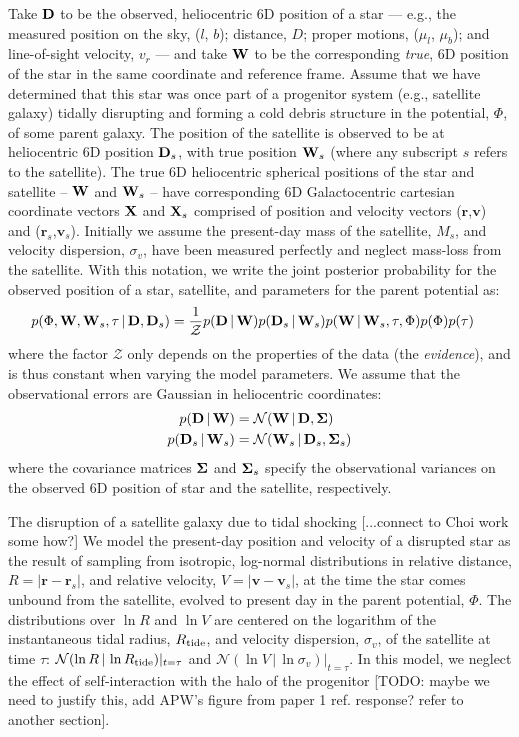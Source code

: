 \documentclass[letterpaper,12pt,preprint]{aastex}
\newcommand{\given}{\,|\,}
\newcommand{\D}{{\bf D}}
\newcommand{\W}{{\bf W}}
\newcommand{\X}{{\bf X}}
\newcommand{\bSigma}{{\bf \Sigma}}
\newcommand{\rtide}{R_{\rm tide}}
\newcommand{\bsr}{\boldsymbol r}
\newcommand{\bsv}{\boldsymbol v}
\begin{document}
Take $\D$ to be the observed, heliocentric 6D position of a star --- e.g., the measured position on the sky, ($l$, $b$); distance, $D$; proper motions, ($\mu_l$, $\mu_b$); and line-of-sight velocity, $v_r$ --- and take $\W$ to be the corresponding \emph{true}, 6D position of the star in the same coordinate and reference frame. Assume that we have determined that this star was once part of a progenitor system (e.g., satellite galaxy) tidally disrupting and forming a cold debris structure in the potential, $\Phi$, of some parent galaxy. The position of the satellite is observed to be at heliocentric 6D position $\D_s$, with true position $\W_s$ (where any subscript $s$ refers to the satellite). The true 6D heliocentric spherical positions of the star and satellite -- $\W$ and $\W_s$ -- have corresponding 6D Galactocentric cartesian coordinate vectors $\X$ and $\X_s$ comprised of position and velocity vectors ($\bsr$,$\bsv$) and ($\bsr_s$,$\bsv_s$). Initially we assume the present-day mass of the satellite, $M_s$, and velocity dispersion, $\sigma_v$, have been measured perfectly and neglect mass-loss from the satellite. With this notation, we write the joint posterior probability for the observed position of a star, satellite, and parameters for the parent potential as:
\begin{align}
	p(\Phi, \W, \W_s, \tau \given \D, \D_s) &= \frac{1}{\mathcal{Z}} p(\D \given \W) p(\D_s \given \W_s) 
												       p(\W \given \W_s, \tau, \Phi) 
												       p(\Phi) p(\tau)
\end{align}
where the factor $\mathcal{Z}$ only depends on the properties of the data (the \emph{evidence}), and is thus constant when varying the model parameters. We assume that the observational errors are Gaussian in heliocentric coordinates:
\begin{align}
	p(\D \given \W) &= \mathcal{N}(\W \given \D, \bSigma)\\
	p(\D_s \given \W_s) &= \mathcal{N}(\W_s \given \D_s, \bSigma_s)
\end{align}
where the covariance matrices $\bSigma$ and $\bSigma_s$ specify the observational variances on the observed 6D position of star and the satellite, respectively. 

The disruption of a satellite galaxy due to tidal shocking [...connect to Choi work some how?] We model the present-day position and velocity of a disrupted star as the result of sampling from isotropic, log-normal distributions in relative distance, $R=\left\vert \bsr-\bsr_s \right\vert$, and relative velocity, $V=\left\vert \bsv-\bsv_s \right\vert$, at the time the star comes unbound from the satellite, evolved to present day in the parent potential, $\Phi$. The distributions over $\ln R$ and $\ln V$ are centered on the logarithm of the instantaneous tidal radius, $R_{\rm tide}$, and velocity dispersion, $\sigma_v$, of the satellite at time $\tau$: $\mathcal{N}(\ln R \given \ln\rtide)\vert_{t=\tau}$ and $\mathcal{N}(\ln V \given \ln \sigma_v)\vert_{t=\tau}$. In this model, we neglect the effect of self-interaction with the halo of the progenitor [TODO: maybe we need to justify this, add APW's figure from paper 1 ref. response? refer to another section]. 
\end{document}
